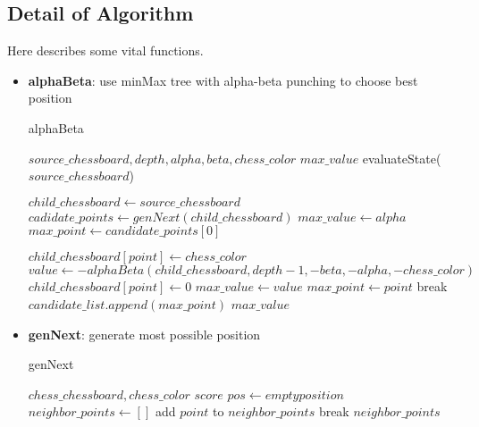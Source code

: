 \documentclass[conference,compsoc]{IEEEtran}
\renewcommand{\algorithmicrequire}{\textbf{Input:}}
\renewcommand{\algorithmicensure}{\textbf{Output:}}
\begin{document}
\subsection{Detail of Algorithm}
Here describes some vital functions.
\begin{itemize}
    \item \textbf{alphaBeta}: use minMax tree with alpha-beta punching to choose
	    best position
    \begin{algorithm}[H]
     \caption{alphaBeta}
     \begin{algorithmic}[1]
     \renewcommand{\algorithmicrequire}{\textbf{Input:}}
     \renewcommand{\algorithmicensure}{\textbf{Output:}}
     \REQUIRE $source\_chessboard, depth, alpha, beta, chess\_color$
     \ENSURE  $max\_value$
     \STATE \RETURN  evaluateState($source\_chessboard$)
     \ENDIF

     \STATE $child\_chessboard\leftarrow source\_chessboard$
     \STATE $cadidate\_points\leftarrow genNext(child\_chessboard)$
     \STATE $max\_value\leftarrow alpha$
     \STATE $max\_point\leftarrow candidate\_points[0]$ 

     \STATE $child\_chessboard[point]\leftarrow chess\_color$ 
     \STATE $value \leftarrow -alphaBeta(child\_chessboard, depth-1,-beta,-alpha, -chess\_color)$ 
     \STATE $child\_chessboard[point]\leftarrow 0$ 
     \STATE $max\_value \leftarrow value$
     \STATE $max\_point \leftarrow point$
          \STATE break
        \ENDIF
     \ENDIF
     \ENDFOR
     \STATE $candidate\_list.append(max\_point)$ 
     \ENDIF
     \RETURN $max\_value$
     \end{algorithmic}
   \end{algorithm}

   \item \textbf{genNext}: generate most possible position
     \begin{algorithm}[H]
     \caption{genNext}
     \begin{algorithmic}[2]
     \renewcommand{\algorithmicrequire}{\textbf{Input:}}
     \renewcommand{\algorithmicensure}{\textbf{Output:}}
     \REQUIRE $chess\_chessboard, chess\_color$
     \ENSURE  $score$
     \STATE $pos \leftarrow empty position$
     \STATE $neighbor\_points \leftarrow []$ 
       \STATE add $point$ to $neighbor\_points$
       \STATE break
       \ENDIF
     \ENDFOR
     \RETURN $neighbor\_points$
     \end{algorithmic}
     \end{algorithm}


\end{itemize}
\end{document}
